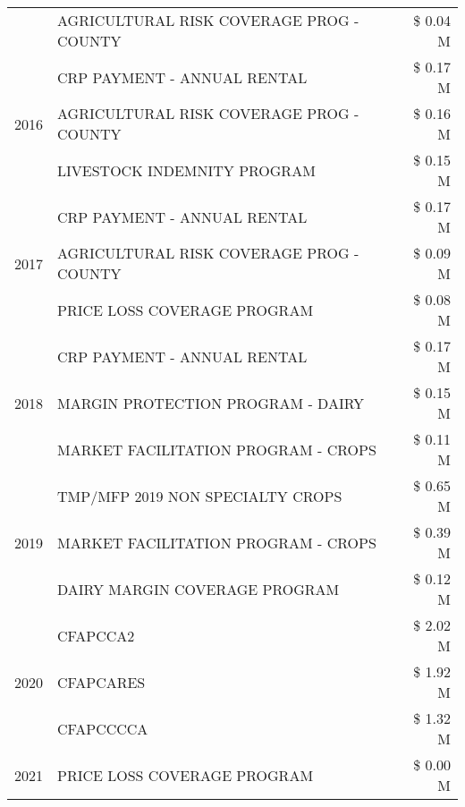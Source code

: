 \begin{tabular}{llr}
 & AGRICULTURAL RISK COVERAGE PROG - COUNTY & \$ 0.04 M \\
\cline{1-3}
\multirow[t]{3}{*}{2016} & CRP PAYMENT - ANNUAL RENTAL & \$ 0.17 M \\
 & AGRICULTURAL RISK COVERAGE PROG - COUNTY & \$ 0.16 M \\
 & LIVESTOCK INDEMNITY PROGRAM & \$ 0.15 M \\
\cline{1-3}
\multirow[t]{3}{*}{2017} & CRP PAYMENT - ANNUAL RENTAL & \$ 0.17 M \\
 & AGRICULTURAL RISK COVERAGE PROG - COUNTY & \$ 0.09 M \\
 & PRICE LOSS COVERAGE PROGRAM & \$ 0.08 M \\
\cline{1-3}
\multirow[t]{3}{*}{2018} & CRP PAYMENT - ANNUAL RENTAL & \$ 0.17 M \\
 & MARGIN PROTECTION PROGRAM - DAIRY & \$ 0.15 M \\
 & MARKET FACILITATION PROGRAM - CROPS & \$ 0.11 M \\
\cline{1-3}
\multirow[t]{3}{*}{2019} & TMP/MFP 2019 NON SPECIALTY CROPS & \$ 0.65 M \\
 & MARKET FACILITATION PROGRAM - CROPS & \$ 0.39 M \\
 & DAIRY MARGIN COVERAGE PROGRAM & \$ 0.12 M \\
\cline{1-3}
\multirow[t]{3}{*}{2020} & CFAPCCA2 & \$ 2.02 M \\
 & CFAPCARES & \$ 1.92 M \\
 & CFAPCCCCA & \$ 1.32 M \\
\cline{1-3}
2021 & PRICE LOSS COVERAGE PROGRAM & \$ 0.00 M \\
\cline{1-3}
\bottomrule
\end{tabular}
